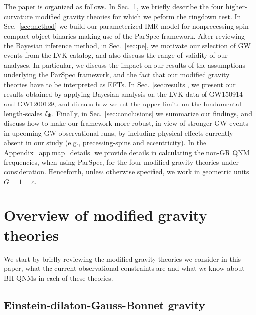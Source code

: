 \documentclass[twocolumn,
               prd,
               aps,
               superscriptaddress,
               tightenlines,
               nofootinbib,
               eqsecnum,
               amsfonts,
               amsmath,
               longbibliography]{revtex4-1}
\begin{document}
The paper is organized as follows. In Sec.~\ref{sec:review_theories}, we briefly describe the four
higher-curvature modified gravity theories for which we peform the ringdown test.
In Sec.~\ref{sec:method} we build our parameterized IMR model for nonprecessing-spin compact-object
binaries making use of the ParSpec framework. After reviewing the Bayesian inference method,
in Sec.~\ref{sec:pe}, we motivate our selection of GW events from the LVK catalog, and also
discuss the range of validity of our analyses. In particular, we discuss the impact on
our results of the assumptions underlying the ParSpec framework, and the fact that
our modified gravity theories have to be interpreted as EFTs. In Sec.~\ref{sec:results},
we present our results obtained by applying Bayesian analysis on the LVK data of
GW150914 and GW1200129, and discuss how we set the upper limits
on the fundamental length-scales $\ell_{\rm th}$. Finally, in Sec.~\ref{sec:conclusions} we
summarize our findings, and discuss how to make our framework more robust, in view
of stronger GW events in upcoming GW observational runs, by including  physical effects currently absent in our
study (e.g., precessing-spins and eccentricity). In the Appendix~\ref{app:map_details}
we provide details in calculating the non-GR QNM frequencies, when using ParSpec,
for the four modified gravity theories under consideration.
%
Henceforth, unless otherwise specified, we work in geometric units $G = 1 = c$.

\section{Overview of modified gravity theories}
\label{sec:review_theories}

We start by briefly reviewing the modified gravity theories we consider in this
paper, what the current observational constraints are and what we know
about BH QNMs in each of these theories.

\subsection{Einstein-dilaton-Gauss-Bonnet gravity}
\label{sec:review_edgb}
\end{document}
